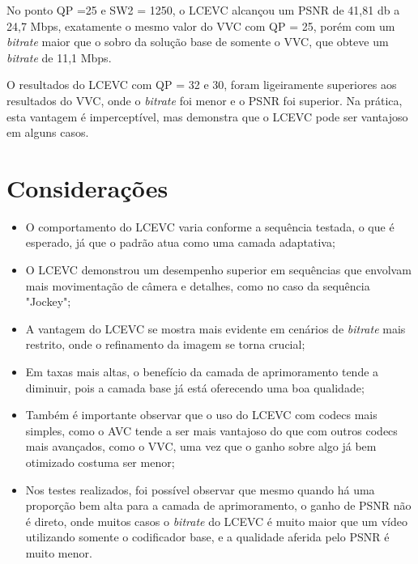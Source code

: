 No ponto QP =25 e SW2 = 1250, o \acrshort{LCEVC} alcançou um \acrshort{PSNR} de 41,81 db
a 24,7 Mbps, exatamente o mesmo valor do \acrshort{VVC} com QP = 25, porém com um
\textit{bitrate} maior que o sobro da solução base de somente o \acrshort{VVC}, que
obteve um \textit{bitrate} de 11,1 Mbps.

O resultados do \acrshort{LCEVC} com QP = 32 e 30, foram ligeiramente superiores
aos resultados do \acrshort{VVC}, onde o \textit{bitrate} foi menor e o \acrshort{PSNR} foi
superior. Na prática, esta vantagem é imperceptível, mas demonstra que o \acrshort{LCEVC}
pode ser vantajoso em alguns casos.

\newpage

\section{Considerações}

\begin{itemize}
    \item O comportamento do \acrshort{LCEVC} varia conforme a sequência testada, o
    que é esperado, já que o padrão atua como uma camada adaptativa;

    \item O \acrshort{LCEVC} demonstrou um desempenho superior em sequências que
    envolvam mais movimentação de câmera e detalhes, como no caso da sequência "Jockey";
    
    \item A vantagem do \acrshort{LCEVC}  se mostra mais evidente em cenários de
    \textit{bitrate} mais restrito, onde o refinamento da imagem se torna crucial;

    \item Em taxas mais altas, o benefício da camada de aprimoramento tende a diminuir,
    pois a camada base já está oferecendo uma boa qualidade;

    \item Também é importante observar que o uso do \acrshort{LCEVC} com codecs mais
    simples, como o \acrshort{AVC} tende a ser mais vantajoso do que com outros codecs
    mais avançados, como o \acrshort{VVC}, uma vez que o ganho sobre algo já bem
    otimizado costuma ser menor;

    \item Nos testes realizados, foi possível observar que mesmo quando há uma proporção
    bem alta para a camada de aprimoramento, o ganho de \acrshort{PSNR} não é direto, onde
    muitos casos o \textit{bitrate} do \acrshort{LCEVC} é muito maior que um vídeo utilizando
    somente o codificador base, e a qualidade aferida pelo \acrshort{PSNR} é muito menor.
\end{itemize}


